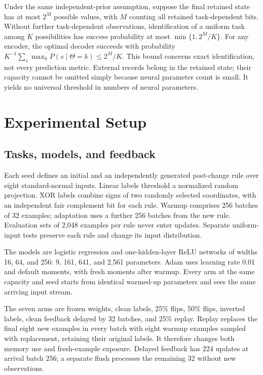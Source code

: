 \documentclass[11pt]{article}
\begin{document}
Under the same independent-prior assumption, suppose the final retained state has at
most $2^M$ possible values, with $M$ counting all retained task-dependent bits.
Without further task-dependent observations, identification of a uniform task
among $K$ possibilities has success probability at most
$\min\{1,2^M/K\}$. For any encoder, the optimal decoder succeeds with probability
$K^{-1}\sum_s\max_k P(s\mid\Theta=k)\leq 2^M/K$.
This bound concerns exact identification, not every prediction metric. External
records belong in the retained state; their capacity cannot be omitted simply
because neural parameter count is small. It yields no universal threshold in
numbers of neural parameters.

\section{Experimental Setup}
\subsection{Tasks, models, and feedback}
Each seed defines an initial and an independently generated post-change rule
over eight standard-normal inputs. Linear labels threshold a normalized random
projection. XOR labels combine signs of two randomly selected coordinates,
with an independent fair complement bit for each rule. Warmup comprises 256
batches of 32 examples; adaptation uses a further 256 batches from the new
rule. Evaluation sets of 2,048 examples per rule never enter updates. Separate
uniform-input tests preserve each rule and change its input distribution.

The models are logistic regression and one-hidden-layer ReLU networks of
widths 16, 64, and 256: 9, 161, 641, and 2,561 parameters. Adam uses learning
rate 0.01 and default moments, with fresh moments after warmup. Every arm at
the same capacity and seed starts from identical warmed-up parameters and
sees the same arriving input stream.

The seven arms are frozen weights, clean labels, 25\% flips, 50\% flips,
inverted labels, clean feedback delayed by 32 batches, and 25\% replay.
Replay replaces the final eight new examples in every batch with eight
warmup examples sampled with replacement, retaining their original labels.
It therefore changes both memory use and fresh-example exposure. Delayed
feedback has 224 updates at arrival batch 256; a separate flush processes
the remaining 32 without new observations.
\end{document}
